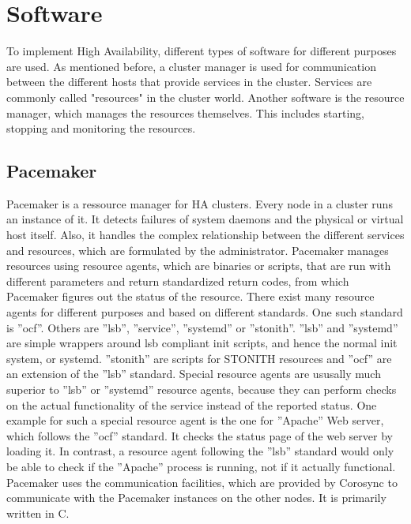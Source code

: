 


\section{Software}
To implement High Availability, different types of software for different purposes are used.
As mentioned before, a cluster manager is used for communication between the different hosts that
provide services in the cluster. Services are commonly called "resources" in the cluster world.
Another software is the resource manager, which manages the resources themselves.
This includes starting, stopping and monitoring the resources.
\subsection{Pacemaker}
Pacemaker is a ressource manager for \ac{HA} clusters. Every node in a cluster
runs an instance of it. It detects failures of system daemons and the physical or
virtual host itself. Also, it handles the complex relationship between the different
services and resources, which are formulated by the administrator. Pacemaker
manages resources using resource agents, which are binaries or scripts,
that are run with different parameters and return standardized return codes,
from which Pacemaker figures out the status of the resource. There exist many
resource agents for different purposes and based on different standards. One
such standard is ''ocf''. Others are ''lsb'', ''service'', ''systemd'' or ''stonith''.
''lsb'' and ''systemd'' are simple wrappers around \ac{lsb} compliant init scripts,
and hence the normal init system, or systemd. ''stonith'' are scripts for \ac{STONITH}
resources and ''ocf'' are an extension of the ''lsb'' standard.
Special resource agents are ususally much superior to ''lsb'' or ''systemd'' resource
agents, because they can perform checks on the actual functionality of the service instead
of the reported status. One example for such a special resource agent is the one for ''Apache'' Web server,  
which follows the ''ocf'' standard. It checks the status page of the web server by loading it.
In contrast, a resource agent following the ''lsb'' standard would only be able to check
if the ''Apache'' process is running, not if it actually functional.
Pacemaker uses the communication facilities, which are provided by Corosync
to communicate with the Pacemaker instances on the other nodes. It is primarily written in C.

